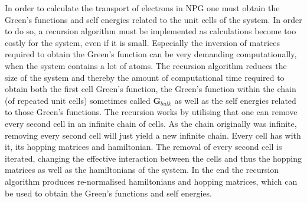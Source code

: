 In order to calculate the transport of electrons in NPG one must obtain the Green's functions and self energies related to the unit cells of the system. In order to do so, a recursion algorithm must be implemented as calculations become too costly for the system, even if it is small. Especially the inversion of matrices required to obtain the Green's function can be very demanding computationally, when the system contains a lot of atoms. The recursion algorithm reduces the size of the system and thereby the amount of computational time required to obtain both the first cell Green's function, the Green's function within the chain (of repeated unit cells) sometimes called \(\mathbf{G}_{bulk}\) as well as the self energies related to those Green's functions. The recursion works by utilising that one can remove every second cell in an infinite chain of cells. As the chain originally was infinite, removing every second cell will just yield a new infinite chain. Every cell has with it, its hopping matrices and hamiltonian. The removal of every second cell is iterated, changing the effective interaction between the cells and thus the hopping matrices as well as the hamiltonians of the system. In the end the recursion algorithm produces re-normalised hamiltonians and hopping matrices, which can be used to obtain the Green's functions and self energies. 
